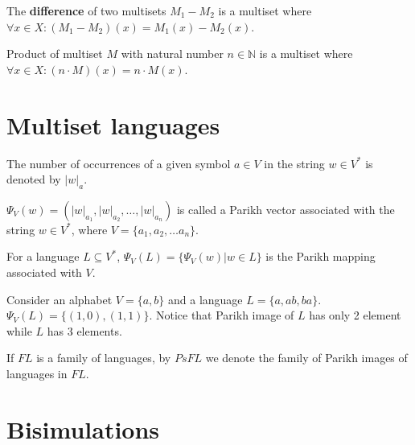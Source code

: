 \begin{definition}
The {\bf difference} of two multisets $M_1-M_2$ is a multiset where $\forall x \in X: (M_1-M_2)(x)=M_1(x)-M_2(x)$.
\end{definition}

\begin{definition}
Product of multiset $M$ with natural number $n\in \mathbb N$ is a multiset where $\forall x \in X: (n\cdot M)(x)=n\cdot M(x)$.  
\end{definition}


\section{Multiset languages} %
\label{sec:multiset_languages}

The number of occurrences of a given symbol $a\in V$ in the string $w\in V^*$ is denoted by $|w|_a$.

\begin{definition}
$\Psi_V(w)=(|w|_{a_1},|w|_{a_2},\dots,|w|_{a_n})$ is called a Parikh vector associated with the string $w\in V^*$, where $V=\{a_1,a_2,\dots a_n\}$.
\end{definition}

\begin{definition}
For a language $L\subseteq V^*$, $\Psi_V(L)=\{\Psi_V(w)|w\in L\}$ is the Parikh mapping associated with $V$.
\end{definition}

\begin{example}
Consider an alphabet $V=\{a,b\}$ and a language $L=\{a, ab, ba\}$.
$\Psi_V(L)=\{(1,0), (1,1)\}$. Notice that Parikh image of $L$ has only 2 element while $L$ has 3 elements.
\end{example}

\begin{definition}
If $FL$ is a family of languages, by $PsFL$ we denote the family of Parikh images of languages in $FL$.
\end{definition}


\section{Bisimulations} %
\label{sec:bisimulations}


